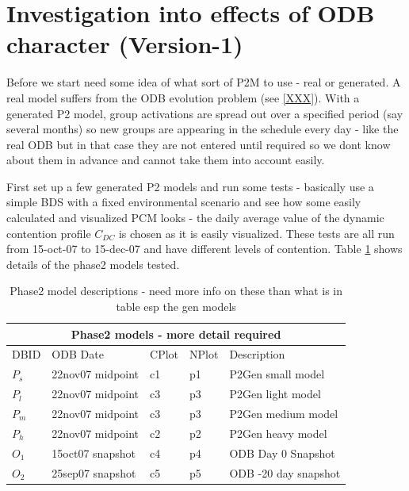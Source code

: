 
\section{Investigation into effects of ODB character (Version-1)}
Before we start need some idea of what sort of P2M to use - real or generated. A real model suffers from the ODB evolution problem (see \ref{XXX}). With a generated P2 model, group activations are spread out over a specified period (say several months) so new groups are appearing in the schedule every day - like the real ODB but in that case they are not entered until required so we dont know about them in advance and cannot take them into account easily.
   
 First set up a few generated P2 models and run some tests - basically use a simple BDS with a fixed environmental scenario and see how some easily calculated and visualized PCM looks - the daily average value of the dynamic contention profile $C_{DC}$ is chosen as it is easily visualized. These tests are all run from 15-oct-07 to 15-dec-07 and have different levels of contention. Table \ref{tab:ltc_p2models} shows details of the phase2 models tested.

\begin{table}[h]
\label{tab:ltc_p2models}
 \begin{center}
  \begin{tabular}{lllll}
   \toprule
   \multicolumn{5}{c}{Phase2 models - more detail required} \\
   \midrule
   DBID & ODB Date & CPlot & NPlot & Description\\
   \midrule
   $P_s$ & 22nov07 midpoint & c1 & p1 & P2Gen small model \\ 
   $P_l$ & 22nov07 midpoint & c3 & p3 & P2Gen light model \\
   $P_m$ & 22nov07 midpoint & c3 & p3 & P2Gen medium model\\
   $P_h$ & 22nov07 midpoint & c2 & p2 & P2Gen heavy model \\
   \midrule
   $O_1$ & 15oct07 snapshot & c4 & p4 & ODB Day 0 Snapshot\\
   $O_2$ & 25sep07 snapshot & c5 & p5 & ODB -20 day snapshot\\
   \bottomrule
  \end{tabular}
 \end{center}
\caption{Phase2 model descriptions - need more info on these than what is in table esp the gen models}
\end{table}

